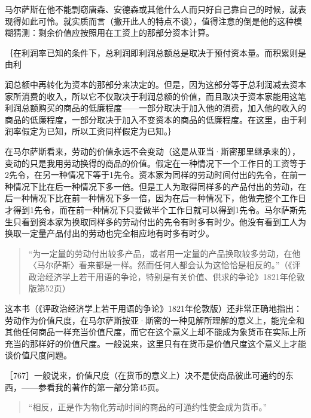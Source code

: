 马尔萨斯在他不能剽窃唐森、安德森或其他什么人而只好自己靠自己的时候，就表现得如此可怜。就实质而言（撇开此人的特点不谈），值得注意的倒是他的这种模糊猜测：剩余价值应按照用在工资上的那部分资本计算。

｛在利润率已知的条件下，总利润即利润总额总是取决于预付资本量。而积累则是由利

润总额中再转化为资本的那部分来决定的。但是，因为这部分等于总利润减去资本家所消费的收入，所以它不仅取决于利润总额的价值，而且取决于资本家能用这笔利润总额购买的商品的低廉程度——一部分取决于加入他的消费，加入他的收入的商品的低廉程度，一部分取决于加入不变资本的商品的低廉程度。在这里，由于利润率假定为已知，所以工资同样假定为已知。｝


在马尔萨斯看来，劳动的价值永远不会变动（这是从亚当·斯密那里继承来的），变动的只是我用劳动换得的商品的价值。假定在一种情况下一个工作日的工资等于2先令，在另一种情况下等于1先令。资本家为同样的劳动时间付出的先令，在前一种情况下比在后一种情况下多一倍。但是工人为取得同样多的产品付出的劳动，在后一种情况下比在前一种情况下多一倍，因为在后一种情况下，他做完整个工作日才得到1先令，而在前一种情况下只要做半个工作日就可以得到1先令。马尔萨斯先生只看到资本家为换取同样多的劳动付出的先令有时多有时少。他没有看到工人为换取一定量产品付出的劳动也完全相应地有时多有时少。

\begin{quote}{“为一定量的劳动付出较多产品，或者用一定量的产品换取较多劳动，在他〈马尔萨斯〉看来都是一样。然而任何人都会认为这恰恰是相反的。”（《评政治经济学上若干用语的争论，特别是有关价值、供求的争论》1821年伦敦版第52页）}\end{quote}

这本书（《评政治经济学上若干用语的争论》1821年伦敦版）还非常正确地指出：劳动作为价值尺度，在马尔萨斯按亚·斯密的一种见解所理解的意义上，能完全和其他任何商品一样充当价值尺度，而它在这个意义上却不能成为象货币在实际上所充当的那样好的价值尺度。一般说来，这里只有在货币是价值尺度这个意义上才能谈价值尺度问题。

［767］一般说来，价值尺度（在货币的意义上）决不是使商品彼此可通约的东西，——参看我的著作的第一部分第45页。

\begin{quote}{“相反，正是作为物化劳动时间的商品的可通约性使金成为货币。”}\end{quote}

